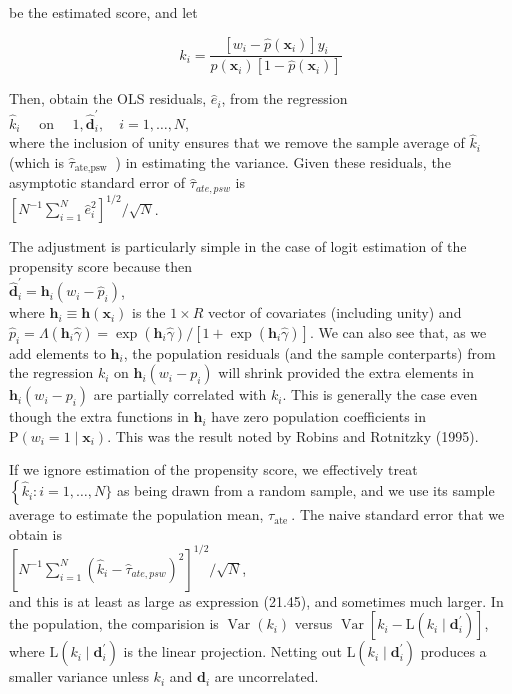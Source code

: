 \documentclass[10pt]{article}
\begin{document}
be the estimated score, and let


\begin{equation*}
\hat{k}_{i}=\frac{\left[w_{i}-\hat{p}\left(\mathbf{x}_{i}\right)\right] y_{i}}{\hat{p}\left(\mathbf{x}_{i}\right)\left[1-\hat{p}\left(\mathbf{x}_{i}\right)\right]} \tag{21.43}
\end{equation*}


Then, obtain the OLS residuals, $\hat{e}_{i}$, from the regression\\
$\hat{k}_{i} \quad$ on $\quad 1, \hat{\mathbf{d}}_{i}^{\prime}, \quad i=1, \ldots, N$,\\
where the inclusion of unity ensures that we remove the sample average of $\hat{k}_{i}$ (which is $\hat{\tau}_{\text {ate,psw }}$ ) in estimating the variance. Given these residuals, the asymptotic standard error of $\hat{\tau}_{a t e, p s w}$ is\\
$\left[N^{-1} \sum_{i=1}^{N} \hat{e}_{i}^{2}\right]^{1 / 2} / \sqrt{N}$.

The adjustment is particularly simple in the case of logit estimation of the propensity score because then\\
$\hat{\mathbf{d}}_{i}^{\prime}=\mathbf{h}_{i}\left(w_{i}-\hat{p}_{i}\right)$,\\
where $\mathbf{h}_{i} \equiv \mathbf{h}\left(\mathbf{x}_{i}\right)$ is the $1 \times R$ vector of covariates (including unity) and $\hat{p}_{i}=\Lambda\left(\mathbf{h}_{i} \hat{\gamma}\right)= \exp \left(\mathbf{h}_{i} \hat{\gamma}\right) /\left[1+\exp \left(\mathbf{h}_{i} \hat{\gamma}\right)\right]$. We can also see that, as we add elements to $\mathbf{h}_{i}$, the population residuals (and the sample conterparts) from the regression $k_{i}$ on $\mathbf{h}_{i}\left(w_{i}-p_{i}\right)$ will shrink provided the extra elements in $\mathbf{h}_{i}\left(w_{i}-p_{i}\right)$ are partially correlated with $k_{i}$. This is generally the case even though the extra functions in $\mathbf{h}_{i}$ have zero population coefficients in $\mathrm{P}\left(w_{i}=1 \mid \mathbf{x}_{i}\right)$. This was the result noted by Robins and Rotnitzky (1995).

If we ignore estimation of the propensity score, we effectively treat $\left\{\hat{k}_{i}: i=\right. 1, \ldots, N\}$ as being drawn from a random sample, and we use its sample average to estimate the population mean, $\tau_{\text {ate }}$. The naive standard error that we obtain is\\
$\left[N^{-1} \sum_{i=1}^{N}\left(\hat{k}_{i}-\hat{\tau}_{a t e, p s w}\right)^{2}\right]^{1 / 2} / \sqrt{N}$,\\
and this is at least as large as expression (21.45), and sometimes much larger. In the population, the comparision is $\operatorname{Var}\left(k_{i}\right)$ versus $\operatorname{Var}\left[k_{i}-\mathrm{L}\left(k_{i} \mid \mathbf{d}_{i}^{\prime}\right)\right]$, where $\mathrm{L}\left(k_{i} \mid \mathbf{d}_{i}^{\prime}\right)$ is the linear projection. Netting out $\mathrm{L}\left(k_{i} \mid \mathbf{d}_{i}^{\prime}\right)$ produces a smaller variance unless $k_{i}$ and $\mathbf{d}_{i}$ are uncorrelated.
\end{document}
